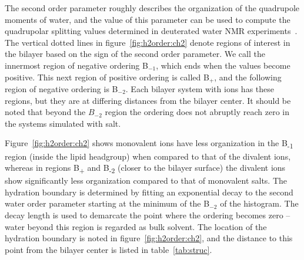 The second order parameter
roughly describes the organization of the quadrupole moments of water, {and the value of this parameter
can be used to compute the} quadrupolar splitting values determined in 
deuterated water NMR experiments~\cite{aaman:2003,kruczek:2017:ether}.
The vertical dotted lines in figure~\ref{fig:h2order:ch2} denote regions of interest in the bilayer 
based on the {sign} of the second order parameter. We call the innermost region of negative ordering
B$_{-1}$, which ends when the values become positive. This next region of positive ordering is
called B$_{+}$, and the following region of negative ordering is B$_{-2}$. Each bilayer system with ions
has these regions, but they are at differing distances from the bilayer center.
It should be noted that beyond the $B_{-2}$ region the ordering does not abruptly reach zero in the systems
simulated with salt.

{
    Figure~\ref{fig:h2order:ch2} shows monovalent ions have 
    less organization in the B\textsubscript{-1} region (inside the lipid headgroup) when compared to that of the divalent ions,  
    whereas in regions B\textsubscript{+} and B\textsubscript{-2} (closer to the bilayer surface) the divalent ions show significantly
    less organization compared to that of monovalent salts.} 
The hydration boundary is determined by  
fitting an exponential decay to the second water order parameter starting
at the minimum of the B$_{-2}$ of the histogram.
The decay length is used to demarcate the point where the ordering becomes zero -- water beyond this region is
regarded as bulk solvent. The location of the hydration boundary 
is noted in figure~\ref{fig:h2order:ch2}, and the distance 
to this point from the bilayer center is listed in table~\ref{tab:struc}.

